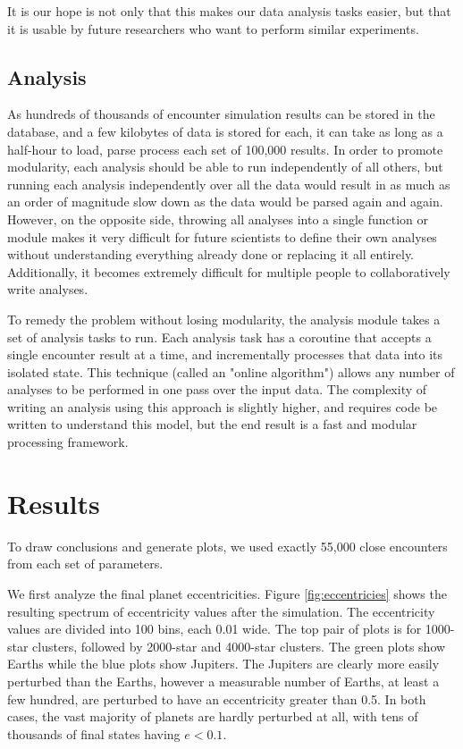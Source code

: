 \documentclass[12pt]{article}
\begin{document}
    It is our hope is not only that this makes our data analysis tasks easier, but
    that it is usable by future researchers who want to perform similar experiments.

    \subsection{Analysis}

    As hundreds of thousands of encounter simulation results can be stored
    in the database, and a few kilobytes of data is stored for each, 
    it can take as long as a half-hour to load, parse process each set of 100,000 results.
    In order to promote modularity, each analysis should be able to run independently
    of all others, but running each analysis independently over all the data would result
    in as much as an order of magnitude slow down as the data would be parsed again and
    again. However, on the opposite side, throwing all analyses into a single function or
    module makes it very difficult for future scientists to define their own analyses
    without understanding everything already done or replacing it all entirely. 
    Additionally, it becomes extremely difficult for multiple people to collaboratively
    write analyses.

    To remedy the problem without losing modularity, the analysis module takes a
    set of analysis tasks to run. Each analysis task has a coroutine that accepts a
    single encounter result at a time, and incrementally processes that data into 
    its isolated state. This technique (called an "online algorithm") allows any number
    of analyses to be performed in one pass over the input data. The complexity of writing
    an analysis using this approach is slightly higher, and requires code be written
    to understand this model, but the end result is a fast and modular processing framework.

\section{Results}

    To draw conclusions and generate plots, we used exactly 55,000 close encounters from
    each set of parameters.

    We first analyze the final planet eccentricities. Figure \ref{fig:eccentricies} shows
    the resulting spectrum of eccentricity values after the simulation. The eccentricity
    values are divided into 100 bins, each 0.01 wide. The top pair
    of plots is for 1000-star clusters, followed by 2000-star and 4000-star clusters.
    The green plots show Earths while the blue plots show Jupiters. The Jupiters are
    clearly more easily perturbed than the Earths, however a measurable number of Earths,
    at least a few hundred, are perturbed to have an eccentricity greater than 0.5. In both
    cases, the vast majority of planets are hardly perturbed at all, with tens of thousands
    of final states having $e<0.1$.
\end{document}

